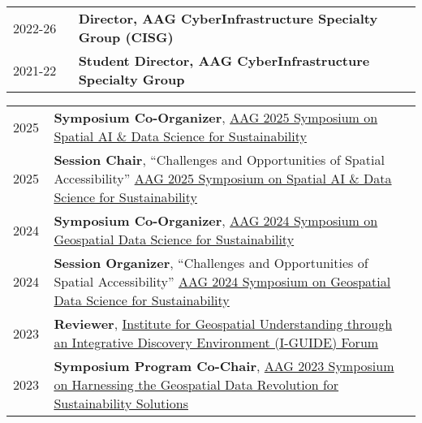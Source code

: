 \documentclass{acmcv}
\begin{document}
\vspace*{0.25cm}

    \begin{longtable}{p{0.16\linewidth} p{0.84\linewidth}}

        2022-26 & \textbf{Director, AAG CyberInfrastructure Specialty Group (CISG)} \\

        2021-22 & \textbf{Student Director, AAG CyberInfrastructure Specialty Group}
    \end{longtable}

    \begin{longtable}{p{0.1\linewidth} p{0.9\linewidth}}
        2025 & \textbf{Symposium Co-Organizer}, \href{https://i-guide.io/aag-2025-symposium-on-spatial-ai-data-science-for-sustainability/}{AAG 2025 Symposium on Spatial AI \& Data Science for Sustainability}\\

        2025 & \textbf{Session Chair}, ``Challenges and Opportunities of Spatial Accessibility'' \href{https://iguide.illinois.edu/aag-2024-symposium-on-geospatial-data-science-for-sustainability/}{AAG 2025 Symposium on Spatial AI \& Data Science for Sustainability}\\

        2024 & \textbf{Symposium Co-Organizer}, \href{https://iguide.illinois.edu/aag-2024-symposium-on-geospatial-data-science-for-sustainability/}{AAG 2024 Symposium on Geospatial Data Science for Sustainability}\\

        2024 & \textbf{Session Organizer}, ``Challenges and Opportunities of Spatial Accessibility'' \href{https://iguide.illinois.edu/aag-2024-symposium-on-geospatial-data-science-for-sustainability/}{AAG 2024 Symposium on Geospatial Data Science for Sustainability}\\
        
        2023 & \textbf{Reviewer}, \href{https://iguide.illinois.edu/forum-2023/}{Institute for Geospatial Understanding through an Integrative Discovery Environment (I-GUIDE) Forum}\\

        2023 & \textbf{Symposium Program Co-Chair}, \href{https://iguide.illinois.edu/aag-2023-symposium-on-harnessing-the-geospatial-data-revolution-for-sustainability-solutions/}{AAG 2023 Symposium on Harnessing the Geospatial Data Revolution for Sustainability Solutions}\\


\end{longtable}
\end{document}
